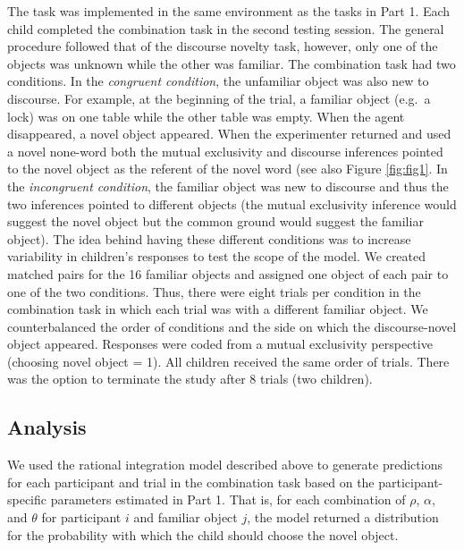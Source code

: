 \documentclass[
  man,floatsintext]{apa6}
\begin{document}
The task was implemented in the same environment as the tasks in Part 1. Each child completed the combination task in the second testing session. The general procedure followed that of the discourse novelty task, however, only one of the objects was unknown while the other was familiar. The combination task had two conditions. In the \emph{congruent condition}, the unfamiliar object was also new to discourse. For example, at the beginning of the trial, a familiar object (e.g.~a lock) was on one table while the other table was empty. When the agent disappeared, a novel object appeared. When the experimenter returned and used a novel none-word both the mutual exclusivity and discourse inferences pointed to the novel object as the referent of the novel word (see also Figure \ref{fig:fig1}. In the \emph{incongruent condition}, the familiar object was new to discourse and thus the two inferences pointed to different objects (the mutual exclusivity inference would suggest the novel object but the common ground would suggest the familiar object). The idea behind having these different conditions was to increase variability in children's responses to test the scope of the model. We created matched pairs for the 16 familiar objects and assigned one object of each pair to one of the two conditions. Thus, there were eight trials per condition in the combination task in which each trial was with a different familiar object. We counterbalanced the order of conditions and the side on which the discourse-novel object appeared. Responses were coded from a mutual exclusivity perspective (choosing novel object = 1). All children received the same order of trials. There was the option to terminate the study after 8 trials (two children).

\hypertarget{analysis-1}{%
\subsection{Analysis}\label{analysis-1}}

We used the rational integration model described above to generate predictions for each participant and trial in the combination task based on the participant-specific parameters estimated in Part 1. That is, for each combination of \(\rho\), \(\alpha\), and \(\theta\) for participant \(i\) and familiar object \(j\), the model returned a distribution for the probability with which the child should choose the novel object.
\end{document}
